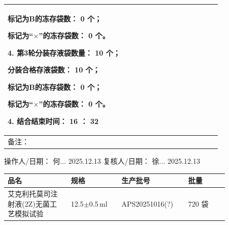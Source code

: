 \documentclass[UTF8,10pt,a4paper,fontset=fandol]{ctexart}
\newcommand{\fieldvalue}[1]{#1}
\newcommand{\handwritten}[1]{#1}
\begin{document}
\begin{tabular}{|p{0.56\linewidth}|p{0.35\linewidth}|}
\quad 标记为B的冻存袋数：
\fieldvalue{\handwritten{0}}
个；

\quad 标记为“$\times$”的冻存袋数：
\fieldvalue{\handwritten{0}}
个。

4. 第3轮分装存液袋数量：
\fieldvalue{\handwritten{10}}
个；

\quad 分装合格存液袋数：
\fieldvalue{\handwritten{10}}
个；

\quad 标记为B的冻存袋数：
\fieldvalue{\handwritten{0}}
个；

\quad 标记为“$\times$”的冻存袋数：
\fieldvalue{\handwritten{0}}
个。

4. 结合结束时间：
\fieldvalue{\handwritten{16}}
：
\fieldvalue{\handwritten{32}} \\
\hline
备注： & \\
\hline
\end{tabular}

\noindent
操作人/日期：
\fieldvalue{\handwritten{何...}}
\quad
\fieldvalue{\handwritten{2025.12.13}}
\qquad
复核人/日期：
\fieldvalue{\handwritten{徐...}}
\quad
\fieldvalue{\handwritten{2025.12.13}}

\newpage

\begin{center}
\small
\begin{tabular}{|p{0.25\linewidth}|p{0.20\linewidth}|p{0.25\linewidth}|p{0.16\linewidth}|}
\hline
品名 & 规格 & 生产批号 & 批量 \\
\hline
艾克利托莫司注射液(2Z)无菌工艺模拟试验
&
12.5$\pm$0.5\,ml
&
\fieldvalue{\handwritten{APS20251016(?)}} 
&
\fieldvalue{\handwritten{720}} 袋
\\
\hline
\end{tabular}
\end{center}
\end{document}
